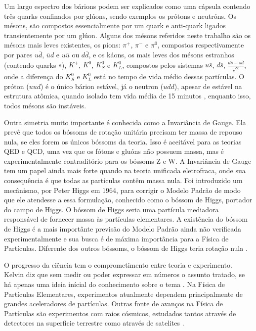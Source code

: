 Um largo espectro dos bárions podem ser explicados como uma cápsula contendo
três quarks confinados por glúons, sendo exemplos os prótons e neutróns. Os mésons, 
são compostos essencialmente por um quark e anti-quark ligados
transientemente por um glúon. Alguns dos mésons referidos neste trabalho são
os mésons mais leves existentes, os píons: $\pi^{+}$,
$\pi^{-}$ e $\pi^{0}$, compostos respectivamente por pares $u\bar{d}$, $\bar{u}d$ e
$u\bar{u}$ ou $d\bar{d}$, e os káons, os mais leves dos mésons estranhos
(contendo quarks $s$), $K^{+}$, $K^{0}$, $K^{0}_{S}$ e $K^{0}_{L}$, 
compostos pelos sistemas $u\bar{s}$, $d\bar{s}$,
$\frac{d\bar{s}+s\bar{d}}{\sqrt{2}}$, onde a diferença do $K^{0}_{S}$ e
$K^{0}_{L}$ está no tempo de vida médio dessas partículas. 
O próton ($uud$) é o único bárion estável, já o neutron ($udd$), apesar de estável na estrutura atômica,
quando isolado tem vida média de 15 minutos \cite{Intro_Standard}, enquanto
isso, todos mésons são instáveis.
 
Outra simetria muito importante é conhecida como a Invariância de Gauge.
Ela prevê que todos os bóssoms de rotação unitária precisam ter
massa de repouso nula, se eles forem os únicos bóssoms da teoria.
Isso é aceitável para as teorias QED e QCD, uma vez que os
fótons e gluóns não possuem massa, mas é experimentalmente contraditório
para os bóssoms Z e W. A Invariância de Gauge tem um papel ainda mais forte
quando na teoria unificada eletrofraca, onde sua consequência é que todas as
partículas contêm massa nula. Foi introduzido um mecânismo, 
por Peter Higgs em 1964, para corrigir o Modelo Padrão de modo que ele atendesse
a essa formulação, conhecido como o bóssom de Higgs, portador do campo de Higgs. O bóssom de Higgs seria
uma partícula mediadora responsável de fornecer massa às partículas elementares.
A existência do bóssom de Higgs é a mais importânte previsão do Modelo Padrão
ainda não verificada experimentalmente e sua busca é de máxima importância para
a Física de Partículas. Diferente dos outros bóssoms, o
bóssom de Higgs teria rotação nula \cite{Intro_Nuclear}.

O progresso da ciência tem o comprometimento entre teoria e experimento. Kelvin
diz que sem medir ou poder expressar em números o assunto tratado, se há apenas
uma ideia inícial do conhecimento sobre o tema \cite{kelvin}. 
Na Física de Partículas Elementares, experimentos atualmente dependem
principalmente de grandes aceleradores de partículas. Outras fonte de avanços na
Física de Partículas são experimentos com raios cósmicos, estudados tantos
através de detectores na superficie terrestre como através de satelites 
\cite{nature_space_and_time}. 

